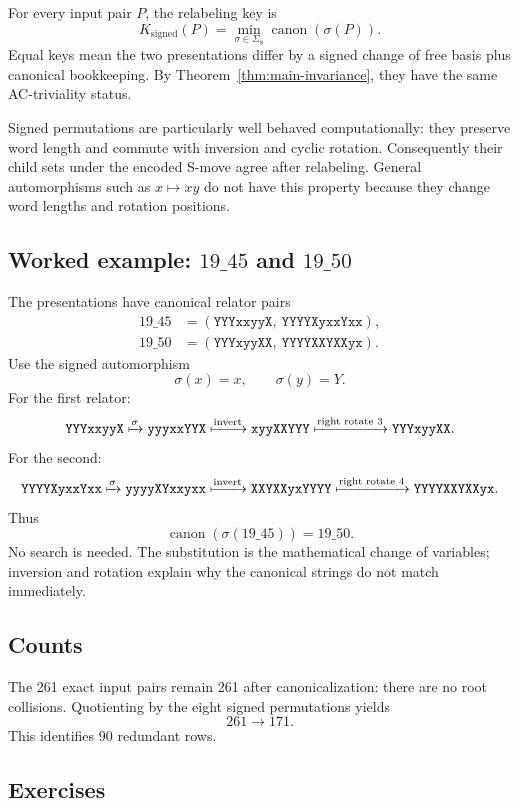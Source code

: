 \documentclass[11pt]{article}
\theoremstyle{definition}
\theoremstyle{remark}
\newcommand{\canon}{\operatorname{canon}}
\begin{document}
For every input pair \(P\), the relabeling key is
\[
  K_{\mathrm{signed}}(P)
  =\min_{\sigma\in\Sigma_8}\canon(\sigma(P)).
\]
Equal keys mean the two presentations differ by a signed change of free
basis plus canonical bookkeeping.  By
Theorem~\ref{thm:main-invariance}, they have the same AC-triviality status.

Signed permutations are particularly well behaved computationally:
they preserve word length and commute with inversion and cyclic rotation.
Consequently their child sets under the encoded S-move agree after
relabeling.  General automorphisms such as \(x\mapsto xy\) do not have this
property because they change word lengths and rotation positions.

\subsection{Worked example: \(19\_45\) and \(19\_50\)}

The presentations have canonical relator pairs
\begin{align*}
19\_45&=(\texttt{YYYxxyyX},\ \texttt{YYYYXyxxYxx}),\\
19\_50&=(\texttt{YYYxyyXX},\ \texttt{YYYYXXYXXyx}).
\end{align*}
Use the signed automorphism
\[
  \sigma(x)=x,\qquad \sigma(y)=Y.
\]
For the first relator:
\[
\texttt{YYYxxyyX}
\xmapsto{\sigma}
\texttt{yyyxxYYX}
\xmapsto{\text{invert}}
\texttt{xyyXXYYY}
\xmapsto{\text{right rotate }3}
\texttt{YYYxyyXX}.
\]
For the second:
\[
\texttt{YYYYXyxxYxx}
\xmapsto{\sigma}
\texttt{yyyyXYxxyxx}
\xmapsto{\text{invert}}
\texttt{XXYXXyxYYYY}
\xmapsto{\text{right rotate }4}
\texttt{YYYYXXYXXyx}.
\]
Thus
\[
\canon(\sigma(19\_45))=19\_50.
\]
No search is needed.  The substitution is the mathematical change of
variables; inversion and rotation explain why the canonical strings do not
match immediately.

\subsection{Counts}

The 261 exact input pairs remain 261 after canonicalization: there are no
root collisions.  Quotienting by the eight signed permutations yields
\[
  261\longrightarrow171.
\]
This identifies 90 redundant rows.

\subsection*{Exercises}
\end{document}
